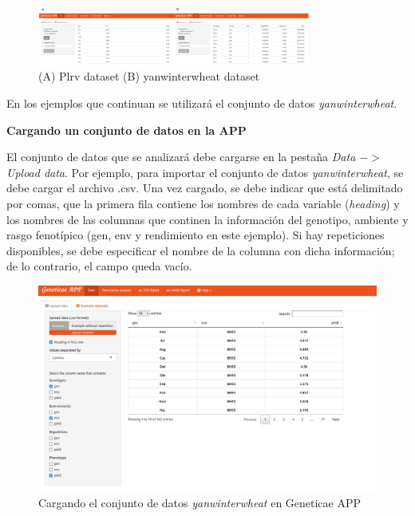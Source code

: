  \begin{figure}[H]
	\begin{center}
		\includegraphics[width=0.8\textwidth]{./Graficos/www/exampledata.jpg}
	\end{center}
	\caption{(A) Plrv dataset (B) yanwinterwheat dataset }
	\label{fig:fig431}
\end{figure}

En los ejemplos que continuan se utilizará el conjunto de datos \emph{yanwinterwheat}.

\textbf{Cargando un conjunto de datos en la APP}

El conjunto de datos que se analizará debe cargarse en la pestaña \emph{Data $->$ Upload data}. Por ejemplo, para importar el conjunto de datos \emph{yanwinterwheat}, se debe cargar el archivo .csv. Una vez cargado, se debe indicar que está delimitado por comas, que la primera fila contiene los nombres de cada variable (\emph{heading}) y los nombres de las columnas que continen la información del genotipo, ambiente y rasgo fenotípico (gen, env y rendimiento en este ejemplo). Si hay repeticiones disponibles, se debe especificar el nombre de la columna con dicha información; de lo contrario, el campo queda vacío. 

 \begin{figure}[H]
	\begin{center}
		\includegraphics[width=16cm]{./Graficos/www/Data.png}
	\end{center}
	\caption{Cargando el conjunto de datos \emph{yanwinterwheat} en Geneticae APP}
	\label{fig:fig431}
\end{figure}


